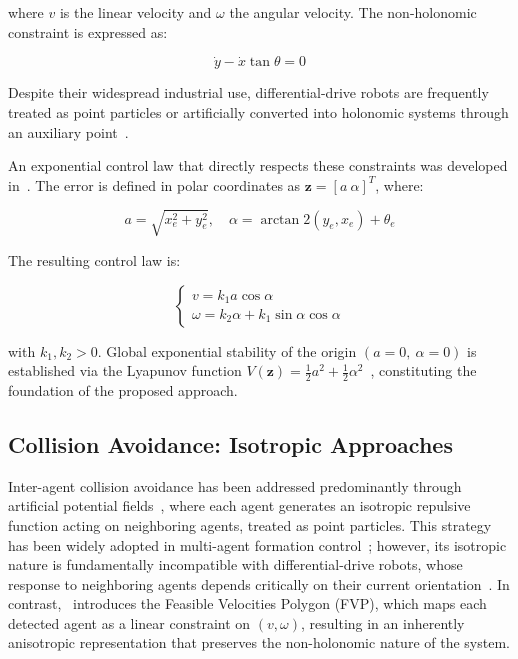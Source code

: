 \noindent where $v$ is the linear velocity and $\omega$ the angular velocity. The non-holonomic constraint is expressed as:

\begin{equation}
    \dot{y} - \dot{x}\tan\theta = 0
    \label{eq:constraint}
\end{equation}

Despite their widespread industrial use, differential-drive robots are frequently treated as point particles or artificially converted into holonomic systems through an auxiliary point~\cite{desai2001modeling}.

An exponential control law that directly respects these constraints was developed in~\cite{ramirez2001collision}. The error is defined in polar coordinates as $\mathbf{z} = [a\ \alpha]^T$, where:

\begin{equation}
    a = \sqrt{x_e^2 + y_e^2}, \quad \alpha = \arctan2(y_e, x_e) + \theta_e
    \label{eq:error}
\end{equation}

The resulting control law is:

\begin{equation}
    \begin{cases}
        v = k_1 a \cos\alpha \\
        \omega = k_2\alpha + k_1 \sin\alpha\cos\alpha
    \end{cases}
    \label{eq:control_law}
\end{equation}

\noindent with $k_1, k_2 > 0$. Global exponential stability of the origin $(a=0,\ \alpha=0)$ is established via the Lyapunov function $V(\mathbf{z}) = \frac{1}{2}a^2 + \frac{1}{2}\alpha^2$~\cite{ramirez2001collision}, constituting the foundation of the proposed approach.

\subsection{Collision Avoidance: Isotropic Approaches}

Inter-agent collision avoidance has been addressed predominantly through artificial potential fields~\cite{khatib1986realtime}, where each agent generates an isotropic repulsive function acting on neighboring agents, treated as point particles. This strategy has been widely adopted in multi-agent formation control~\cite{li2021artificial, zhao2024improved}; however, its isotropic nature is fundamentally incompatible with differential-drive robots, whose response to neighboring agents depends critically on their current orientation~\cite{chen2023auv}. In contrast,~\cite{ramirez2001collision} introduces the Feasible Velocities Polygon (FVP), which maps each detected agent as a linear constraint on $(v, \omega)$, resulting in an inherently anisotropic representation that preserves the non-holonomic nature of the system.